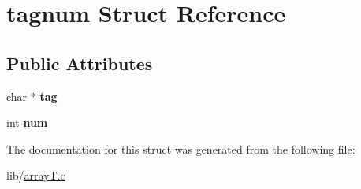 \hypertarget{structtagnum}{}\section{tagnum Struct Reference}
\label{structtagnum}
\subsection*{Public Attributes}
\begin{DoxyCompactItemize}
\item 
char $\ast$ {\bfseries tag}\hypertarget{structtagnum_aa64db27335e72f0397696367a742e888}{}\label{structtagnum_aa64db27335e72f0397696367a742e888}

\item 
int {\bfseries num}\hypertarget{structtagnum_a8a30cf3e4aa95c6ad641026e1034a7b8}{}\label{structtagnum_a8a30cf3e4aa95c6ad641026e1034a7b8}

\end{DoxyCompactItemize}


The documentation for this struct was generated from the following file\+:\begin{DoxyCompactItemize}
\item 
lib/\hyperlink{arrayT_8c}{array\+T.\+c}\end{DoxyCompactItemize}
